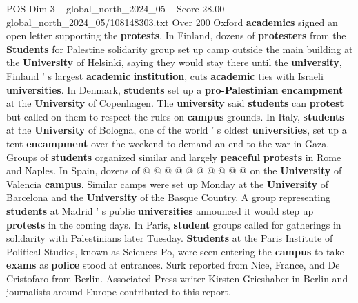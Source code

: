 \begin{textsample}{POS Dim 3 – global\_north\_2024\_05 – Score 28.00 – global\_north\_2024\_05/108148303.txt}
Over 200 Oxford \textbf{academics} signed an open letter supporting the \textbf{protests}.
In Finland, dozens of \textbf{protesters} from the \textbf{Students} for Palestine solidarity group set up camp outside the main building at the \textbf{University} of Helsinki, saying they would stay there until the \textbf{university}, Finland ' s largest \textbf{academic} \textbf{institution}, cuts \textbf{academic} ties with Israeli \textbf{universities}.
In Denmark, \textbf{students} set up a \textbf{pro-Palestinian} \textbf{encampment} at the \textbf{University} of Copenhagen.
The \textbf{university} said \textbf{students} can \textbf{protest} but called on them to respect the rules on \textbf{campus} grounds.
In Italy, \textbf{students} at the \textbf{University} of Bologna, one of the world ' s oldest \textbf{universities}, set up a tent \textbf{encampment} over the weekend to demand an end to the war in Gaza.
Groups of \textbf{students} organized similar and largely \textbf{peaceful} \textbf{protests} in Rome and Naples.
In Spain, dozens of @ @ @ @ @ @ @ @ @ @ on the \textbf{University} of Valencia \textbf{campus}.
Similar camps were set up Monday at the \textbf{University} of Barcelona and the \textbf{University} of the Basque Country.
A group representing \textbf{students} at Madrid ' s public \textbf{universities} announced it would step up \textbf{protests} in the coming days.
In Paris, \textbf{student} groups called for gatherings in solidarity with Palestinians later Tuesday. \textbf{Students} at the Paris Institute of Political Studies, known as Sciences Po, were seen entering the \textbf{campus} to take \textbf{exams} as \textbf{police} stood at entrances.
Surk reported from Nice, France, and De Cristofaro from Berlin.
Associated Press writer Kirsten Grieshaber in Berlin and journalists around Europe contributed to this report.

\end{textsample}
